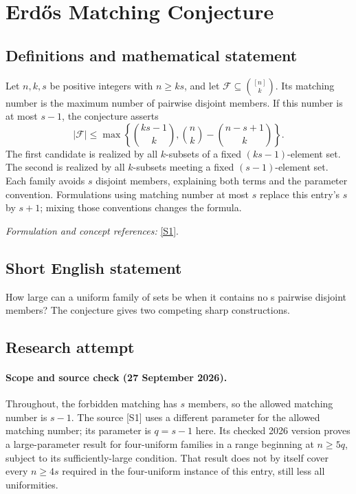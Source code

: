 \documentclass[11pt]{article}
\begin{document}
\section*{\texorpdfstring{Erdős Matching Conjecture}{Erdős Matching Conjecture}}\label{450}
\subsection{Definitions and mathematical statement}
Let $n,k,s$ be positive integers with $n\ge ks$, and let $\mathcal F\subseteq\binom{[n]}k$. Its matching number is the maximum number of pairwise disjoint members. If this number is at most $s-1$, the conjecture asserts
\[
 |\mathcal F|\le
 \max\left\{\binom{ks-1}{k},
 \binom nk-\binom{n-s+1}{k}\right\}.
\]
The first candidate is realized by all $k$-subsets of a fixed $(ks-1)$-element set. The second is realized by all $k$-subsets meeting a fixed $(s-1)$-element set. Each family avoids $s$ disjoint members, explaining both terms and the parameter convention. Formulations using matching number at most $s$ replace this entry's $s$ by $s+1$; mixing those conventions changes the formula.
\par\smallskip\textit{Formulation and concept references:} \href{https://arxiv.org/pdf/2602.19230}{[S1]}.

\subsection{Short English statement}
How large can a uniform family of sets be when it contains no s pairwise disjoint members? The conjecture gives two competing sharp constructions.
\subsection{Research attempt}
\paragraph{Scope and source check (27 September 2026).}
Throughout, the forbidden matching has $s$ members, so the allowed matching number is $s-1$. The source [S1] uses a different parameter for the allowed matching number; its parameter is $q=s-1$ here. Its checked 2026 version proves a large-parameter result for four-uniform families in a range beginning at $n\geq5q$, subject to its sufficiently-large condition. That result does not by itself cover every $n\geq4s$ required in the four-uniform instance of this entry, still less all uniformities.
\end{document}
